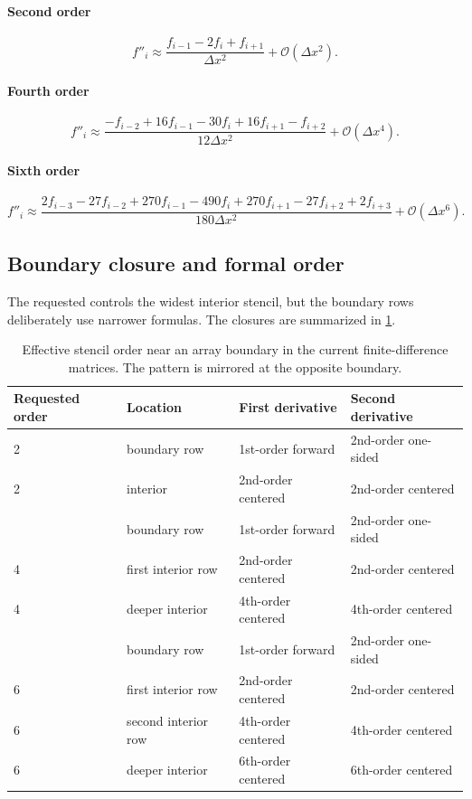 \documentclass[11pt,a4paper]{article}
\newcommand{\Oh}{\mathcal{O}}
\newcommand{\code}[1]{\texttt{\detokenize{#1}}}
\begin{document}
\paragraph{Second order}
\begin{equation}
 f''_i \approx
 \frac{f_{i-1}-2f_i+f_{i+1}}{\Delta x^2}
 +\Oh(\Delta x^2).
\end{equation}

\paragraph{Fourth order}
\begin{equation}
 f''_i \approx
 \frac{-f_{i-2}+16f_{i-1}-30f_i+16f_{i+1}-f_{i+2}}
 {12\Delta x^2}
 +\Oh(\Delta x^4).
\end{equation}

\paragraph{Sixth order}
\begin{equation}
 f''_i \approx
 \frac{2f_{i-3}-27f_{i-2}+270f_{i-1}-490f_i+270f_{i+1}-27f_{i+2}+2f_{i+3}}
 {180\Delta x^2}
 +\Oh(\Delta x^6).
\label{eq:second-sixth}
\end{equation}

\subsection{Boundary closure and formal order}

The requested \code{order} controls the widest interior stencil, but the boundary rows deliberately use narrower formulas.  The closures are summarized in \cref{tab:closure}.

\begin{table}[htbp]
\centering
\caption{Effective stencil order near an array boundary in the current finite-difference matrices.  The pattern is mirrored at the opposite boundary.}
\label{tab:closure}
\begin{tabular}{@{}llll@{}}
\toprule
Requested order & Location & First derivative & Second derivative \\
\midrule
2 & boundary row & 1st-order forward & 2nd-order one-sided \\
2 & interior & 2nd-order centered & 2nd-order centered \\
\addlinespace
4 & boundary row & 1st-order forward & 2nd-order one-sided \\
4 & first interior row & 2nd-order centered & 2nd-order centered \\
4 & deeper interior & 4th-order centered & 4th-order centered \\
\addlinespace
6 & boundary row & 1st-order forward & 2nd-order one-sided \\
6 & first interior row & 2nd-order centered & 2nd-order centered \\
6 & second interior row & 4th-order centered & 4th-order centered \\
6 & deeper interior & 6th-order centered & 6th-order centered \\
\bottomrule
\end{tabular}
\end{table}
\end{document}
